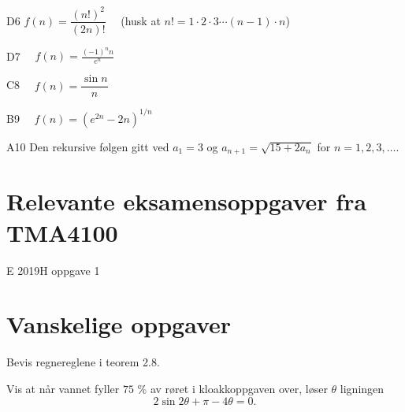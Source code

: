 \documentclass[a4paper,norsk,11pt]{interaktiv}
\begin{document}
\begin{oppgave}{D6}
\quad $f(n)=\dfrac{(n!)^2}{(2n)!} \quad$ (husk at $n! = 1 \cdot 2 \cdot 3 \cdots (n-1) \cdot n$)
\end{oppgave}

\begin{oppgave}{D7}
$
\quad f(n)=\frac{(-1)^n n}{e^n}
$
\end{oppgave}

\begin{oppgave}{C8}
$\quad f(n)=\dfrac{\sin n}{n}$
\end{oppgave}


\begin{oppgave}{B9}
$
\quad  f(n)=(e^{2n}-2n)^{1/n}
$
\end{oppgave}
\setcounter{Punkt}{0}


\begin{oppgave}{A10}
Den rekursive følgen gitt ved $a_1 = 3$ og $a_{n+1} = \sqrt{15 + 2a_n}$ for $n=1,2,3,\ldots$. 
\end{oppgave}

\section*{Relevante eksamensoppgaver fra TMA4100}

\begin{oppgave}{E}
2019H oppgave 1
\end{oppgave}

\section*{Vanskelige oppgaver}

\begin{oppgave}{1}
Bevis regnereglene i teorem 2.8.
\end{oppgave}

\begin{oppgave}{2}
  Vis at når vannet fyller $75$ \% av røret i kloakkoppgaven over, løser $\theta$
  ligningen
  \begin{equation*}
    2\sin 2\theta + \pi - 4\theta = 0.
  \end{equation*}
\end{oppgave}
\end{document}
